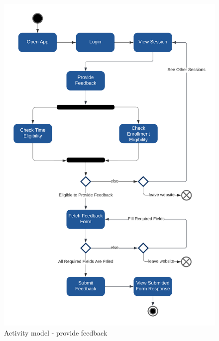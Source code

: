 \begin{figure}[H]
    \centerline{\includegraphics[width=150mm,scale=1]{figures/analysis_and_design/analysis/2. Provide Feedback.png}}
    \caption{Activity model - provide feedback}
    \label{provideFeedback}
\end{figure}

